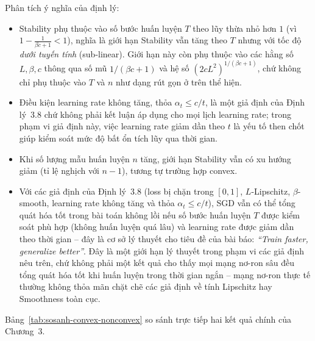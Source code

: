 Phân tích ý nghĩa của định lý:
\begin{itemize}
    \item Stability phụ thuộc vào số bước huấn luyện $T$ theo lũy thừa nhỏ hơn $1$ (vì $1 - \frac{1}{\beta c+1} < 1$), nghĩa là giới hạn Stability vẫn tăng theo $T$ nhưng với tốc độ \emph{dưới tuyến tính} (sub-linear). Giới hạn này còn phụ thuộc vào các hằng số $L, \beta, c$ thông qua số mũ $1/(\beta c+1)$ và hệ số $(2cL^2)^{1/(\beta c+1)}$, chứ không chỉ phụ thuộc vào $T$ và $n$ như dạng rút gọn ở trên thể hiện.
    \item Điều kiện learning rate không tăng, thỏa $\alpha_t \le c/t$, là một giả định của Định lý~3.8 chứ không phải kết luận áp dụng cho mọi lịch learning rate; trong phạm vi giả định này, việc learning rate giảm dần theo $t$ là yếu tố then chốt giúp kiểm soát mức độ bất ổn tích lũy qua thời gian.
    \item Khi số lượng mẫu huấn luyện $n$ tăng, giới hạn Stability vẫn có xu hướng giảm (tỉ lệ nghịch với $n-1$), tương tự trường hợp convex.
    \item Với các giả định của Định lý~3.8 (loss bị chặn trong $[0,1]$, $L$-Lipschitz, $\beta$-smooth, learning rate không tăng và thỏa $\alpha_t \le c/t$), SGD vẫn có thể tổng quát hóa tốt trong bài toán không lồi nếu số bước huấn luyện $T$ được kiểm soát phù hợp (không huấn luyện quá lâu) và learning rate được giảm dần theo thời gian -- đây là cơ sở lý thuyết cho tiêu đề của bài báo: \textit{``Train faster, generalize better''}. Đây là một giới hạn lý thuyết trong phạm vi các giả định nêu trên, chứ không phải một kết quả cho thấy mọi mạng nơ-ron sâu đều tổng quát hóa tốt khi huấn luyện trong thời gian ngắn -- mạng nơ-ron thực tế thường không thỏa mãn chặt chẽ các giả định về tính Lipschitz hay Smoothness toàn cục.
\end{itemize}

Bảng~\ref{tab:sosanh-convex-nonconvex} so sánh trực tiếp hai kết quả chính của Chương~3.

